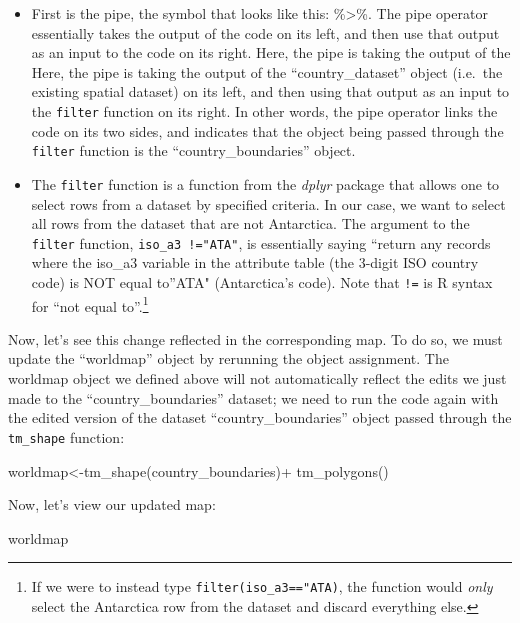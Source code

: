 \documentclass[
]{article}
\newenvironment{Shaded}{\begin{snugshade}}{\end{snugshade}}
\newcommand{\FunctionTok}[1]{\textcolor[rgb]{0.00,0.00,0.00}{#1}}
\newcommand{\NormalTok}[1]{#1}
\newcommand{\OtherTok}[1]{\textcolor[rgb]{0.56,0.35,0.01}{#1}}
\newcommand{\SpecialCharTok}[1]{\textcolor[rgb]{0.00,0.00,0.00}{#1}}
\providecommand{\tightlist}{%
  \setlength{\itemsep}{0pt}\setlength{\parskip}{0pt}}
\begin{document}
\begin{itemize}
\tightlist
\item
  First is the pipe, the symbol that looks like this: \%\textgreater\%. The pipe operator essentially takes the output of the code on its left, and then use that output as an input to the code on its right. Here, the pipe is taking the output of the Here, the pipe is taking the output of the ``country\_dataset'' object (i.e.~the existing spatial dataset) on its left, and then using that output as an input to the \texttt{filter} function on its right. In other words, the pipe operator links the code on its two sides, and indicates that the object being passed through the \texttt{filter} function is the ``country\_boundaries'' object.
\item
  The \texttt{filter} function is a function from the \emph{dplyr} package that allows one to select rows from a dataset by specified criteria. In our case, we want to select all rows from the dataset that are not Antarctica. The argument to the \texttt{filter} function, \texttt{iso\_a3\ !="ATA"}, is essentially saying ``return any records where the iso\_a3 variable in the attribute table (the 3-digit ISO country code) is NOT equal to''ATA" (Antarctica's code). Note that \texttt{!=} is R syntax for ``not equal to''.\footnote{If we were to instead type \texttt{filter(iso\_a3=="ATA)}, the function would \emph{only} select the Antarctica row from the dataset and discard everything else.}
\end{itemize}

Now, let's see this change reflected in the corresponding map. To do so, we must update the ``worldmap'' object by rerunning the object assignment. The worldmap object we defined above will not automatically reflect the edits we just made to the ``country\_boundaries'' dataset; we need to run the code again with the edited version of the dataset ``country\_boundaries'' object passed through the \texttt{tm\_shape} function:

\begin{Shaded}
\begin{Highlighting}[]
\NormalTok{worldmap}\OtherTok{\textless{}{-}}\FunctionTok{tm\_shape}\NormalTok{(country\_boundaries)}\SpecialCharTok{+}
            \FunctionTok{tm\_polygons}\NormalTok{()}
\end{Highlighting}
\end{Shaded}

Now, let's view our updated map:

\begin{Shaded}
\begin{Highlighting}[]
\NormalTok{worldmap}
\end{Highlighting}
\end{Shaded}
\end{document}
